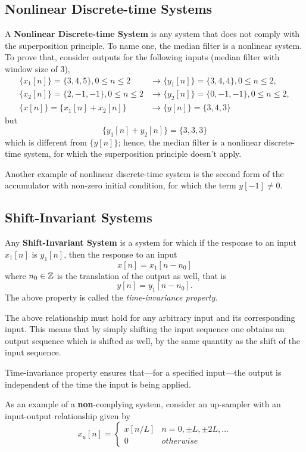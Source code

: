 \documentclass[\documentfontsize, twocolumn]{\classname}
\begin{document}
\subsection{Nonlinear Discrete-time Systems}

A \textbf{Nonlinear Discrete-time System} is any system that does not comply with the superposition principle. To name one, the median filter is a nonlinear system. To prove that, consider outputs for the following inputs (median filter with window size of $3$),
\begin{align*}
    \{x_1[n]\} = \{3,4,5\}, 0 \leq n \leq 2 &\longrightarrow \{y_1[n]\}=\{3,4,4\}, 0 \leq n \leq 2,\\
    \{x_2[n]\} = \{2,-1,-1\}, 0 \leq n \leq 2 &\longrightarrow \{y_2[n]\}=\{0,-1,-1\}, 0 \leq n \leq 2,\\
    \{x[n]\} = \{x_1[n] + x_2[n]\} &\longrightarrow \{y[n]\}=\{3,4,3\}
\end{align*}
but 
\[\{y_1[n] + y_2[n]\} = \{3, 3, 3\}\]
which is different from $\{y[n]\}$; hence, the median filter is a nonlinear discrete-time system, for which the superposition principle doesn't apply.

Another example of nonlinear discrete-time system is the second form of the accumulator with non-zero initial condition, for which the term $y[-1] \neq 0$.

\subsection{Shift-Invariant Systems}

Any \textbf{Shift-Invariant System} is a system for which if the response to an input $x_1[n]$ is $y_1[n]$, then the response to an input \[x[n] = x_1[n-n_0]\] where $n_0 \in \mathbb Z$ is the translation of the output as well, that is \[y[n] = y_1[n-n_0].\] The above property is called the \emph{time-invariance property}.

The above relationship must hold for any arbitrary input and its corresponding input. This means that by simply shifting the input sequence one obtains an output sequence which is shifted as well, by the same quantity as the shift of the input sequence.

Time-invariance property ensures that---for a specified input---the output is independent of the time the input is being applied. 

As an example of a \textbf{non}-complying system, consider an up-sampler with an input-output relationship given by
\[
	x_u[n] =
	\left\{
		\begin{array}{ll}
			x[n/L] 	& n=0,\pm L, \pm 2L, \dots \\
			0 	& otherwise
		\end{array}
	\right.
\]
\end{document}
